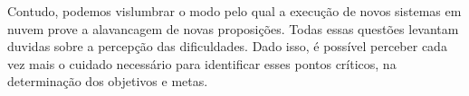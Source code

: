 \documentclass[12pt]{article}
\begin{document}
Contudo, podemos vislumbrar o modo pelo qual a execução de novos sistemas em nuvem prove a alavancagem de novas proposições. Todas essas questões levantam duvidas sobre a percepção das dificuldades. Dado isso, é possível perceber cada vez mais o cuidado necessário para identificar esses pontos críticos, na determinação dos objetivos e metas.
\nocite{*}
\medskip



\end{document}
